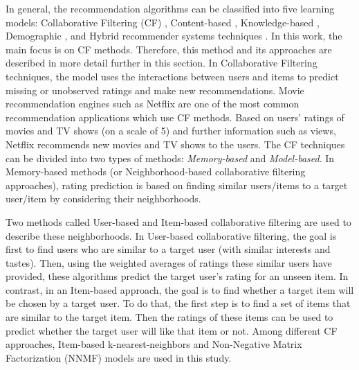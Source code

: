     In general, the recommendation algorithms can be classified into five learning models: Collaborative Filtering (CF) \cite{Breese1998CF,Aggarwal1999CF}, Content-based \cite{chakrabarti2002mining,wu2008top}, Knowledge-based \cite{burke2000knowledge}, Demographic \cite{Krulwich_1997,pazzani1999framework}, and Hybrid recommender systems techniques \cite{burke2002hybrid}. In this work, the main focus is on CF methods. Therefore, this method and its approaches are described in more detail further in this section. In Collaborative Filtering techniques, the model uses the interactions between users and items to predict missing or unobserved ratings and make new recommendations. Movie recommendation engines such as Netflix are one of the most common recommendation applications which use CF methods. Based on users’ ratings of movies and TV shows (on a scale of 5) and further information such as views, Netflix recommends new movies and TV shows to the users. The CF techniques can be divided into two types of methods: \textit{Memory-based} and \textit{Model-based}. In Memory-based methods (or Neighborhood-based collaborative filtering approaches), rating prediction is based on finding similar users/items to a target user/item by considering their neighborhoods. 
    
    Two methods called User-based and Item-based collaborative filtering are used to describe these neighborhoods. In User-based collaborative filtering, the goal is first to find users who are similar to a target user (with similar interests and tastes). Then, using the weighted averages of ratings these similar users have provided, these algorithms predict the target user's rating for an unseen item. In contrast, in an Item-based approach, the goal is to find whether a target item will be chosen by a target user. To do that, the first step is to find a set of items that are similar to the target item. Then the ratings of these items can be used to predict whether the target user will like that item or not. Among different CF approaches, Item-based k-nearest-neighbors \cite{desrosiers2011comprehensive} and Non-Negative Matrix Factorization (NNMF) \cite{koren20009mf} models are used in this study.
    

